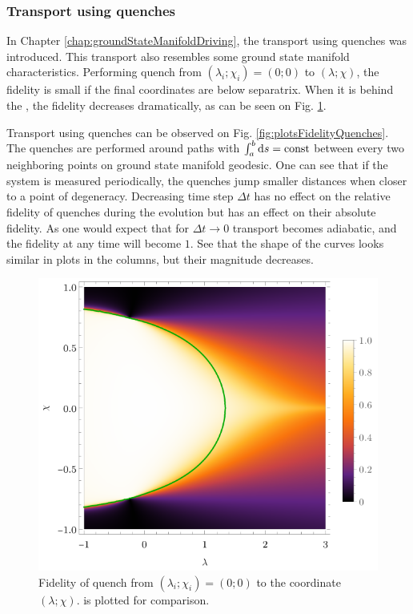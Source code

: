 \subsubsection{Transport using quenches}
In Chapter \ref{chap:groundStateManifoldDriving}, the transport using quenches was introduced. This transport also resembles some ground state manifold characteristics. Performing quench from $(\lambda_i;\chi_i)=(0;0)$ to $(\lambda;\chi)$, the fidelity is small if the final coordinates are below separatrix. When it is behind the , the fidelity decreases dramatically, as can be seen on Fig. \ref{fig:quenchFidelityFrom00}.

Transport using quenches can be observed on Fig. \ref{fig:plotsFidelityQuenches}. The quenches are performed around paths with $\int_{a}^{b} \mathrm{d} s=\text{const}$ between every two neighboring points on ground state manifold geodesic. One can see that if the system is measured periodically, the quenches jump smaller distances when closer to a point of degeneracy. Decreasing time step $\Delta t$ has no effect on the relative fidelity of quenches during the evolution but has an effect on their absolute fidelity. As one would expect that for $\Delta t\rightarrow 0$ transport becomes adiabatic, and the fidelity at any time will become $1$. See that the shape of the curves looks similar in plots in the columns, but their magnitude decreases.

\begin{figure}[H]
    \centering
    \includegraphics[scale=1.2]{../img/quenchFidelityFrom00.pdf}
    \caption{Fidelity of quench from $(\lambda_i;\chi_i)=(0;0)$ to the coordinate $(\lambda;\chi)$.  is plotted for comparison.}
    \label{fig:quenchFidelityFrom00}    
\end{figure}

